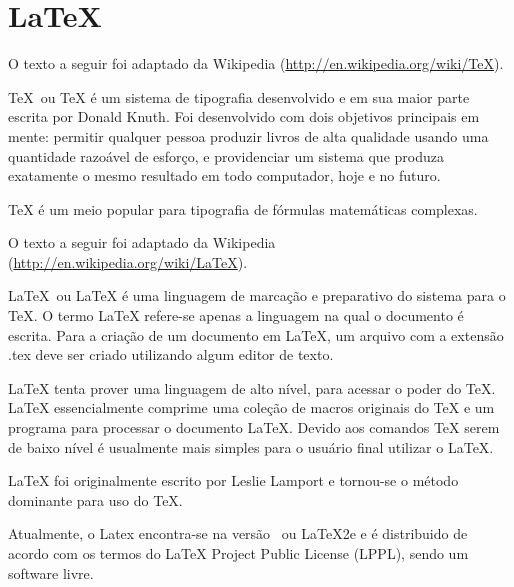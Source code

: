 % 
% 
% 
% 
% 
\chapter{\LaTeX}
O texto a seguir foi adaptado da Wikipedia (\url{http://en.wikipedia.org/wiki/TeX}).

\TeX\ ou TeX é um sistema de tipografia desenvolvido e em sua maior parte escrita por Donald Knuth. Foi desenvolvido com dois objetivos principais em mente: permitir qualquer pessoa produzir livros de alta qualidade usando uma quantidade razoável de esforço, e providenciar um sistema que produza exatamente o mesmo resultado em todo computador, hoje e no futuro.

TeX é um meio popular para tipografia de fórmulas matemáticas complexas.

O texto a seguir foi adaptado da Wikipedia (\url{http://en.wikipedia.org/wiki/LaTeX}).

\LaTeX\ ou LaTeX é uma linguagem de marcação e preparativo do sistema para o TeX. O termo LaTeX refere-se apenas a linguagem na qual o documento é escrita. Para a criação de um documento em LaTeX, um arquivo com a extensão \textsf{.tex} deve ser criado utilizando algum editor de texto.

LaTeX tenta prover uma linguagem de alto nível, para acessar o poder do TeX. LaTeX essencialmente comprime uma coleção de macros originais do TeX e um programa para processar o documento LaTeX. Devido aos comandos TeX serem de baixo nível é usualmente mais simples para o usuário final utilizar o LaTeX.

LaTeX foi originalmente escrito por Leslie Lamport e tornou-se o método dominante para uso do TeX.

Atualmente, o Latex encontra-se na versão \LaTeXe\ ou LaTeX2e e é distribuido de acordo com os termos do LaTeX Project Public License (LPPL), sendo um software livre.
